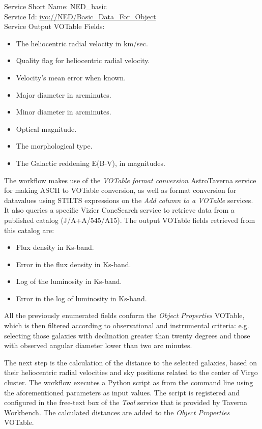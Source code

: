 \documentclass[final,authoryear,5p,times,twocolumn]{elsarticle}
\begin{document}
\begin{minipage}[h]{0.99\columnwidth}
  \small \vspace{\baselineskip}
  \noindent Service Short Name: NED\_basic\\
Service Id: \url{ivo://NED/Basic\_Data\_For\_Object}\\
Service Output VOTable Fields:
\begin{itemize}
\item The heliocentric radial velocity in km/sec.
\item Quality flag for heliocentric radial velocity.
\item Velocity's mean error when known.
\item Major diameter in arcminutes.
\item Minor diameter in arcminutes.
\item Optical magnitude.
\item The morphological type.
\item The Galactic reddening E(B-V), in magnitudes.
\end{itemize}
\vspace{\baselineskip}
\end{minipage}

The workflow makes use of the \textit{VOTable format conversion} AstroTaverna service for making ASCII to VOTable conversion, as well as format conversion for datavalues using STILTS expressions on the \textit{Add column to a VOTable} services. It also queries a specific Vizier ConeSearch service to retrieve data from a published catalog (J/A+A/545/A15). The output VOTable fields retrieved from this catalog are:


\begin{itemize}
\item Flux density in Ks-band. 
\item Error in the flux density in Ks-band.
\item Log of the luminosity in Ks-band.
\item Error in the log of luminosity in Ks-band.
\end{itemize}

All the previously enumerated fields conform the \textit{Object Properties} VOTable, which is then filtered according to observational and instrumental criteria: e.g. selecting those galaxies with declination greater than twenty degrees and those with observed angular diameter lower than two arc minutes. 

The next step is the calculation of the distance to the selected galaxies, based on their heliocentric radial velocities and sky positions related to the center of Virgo cluster. The workflow executes a Python script as from the command line using the aforementioned parameters as input values. The script is registered and configured in the free-text box of the \textit{Tool} service that is provided by Taverna Workbench. The calculated distances are added to the \textit{Object Properties} VOTable. 
\end{document}
